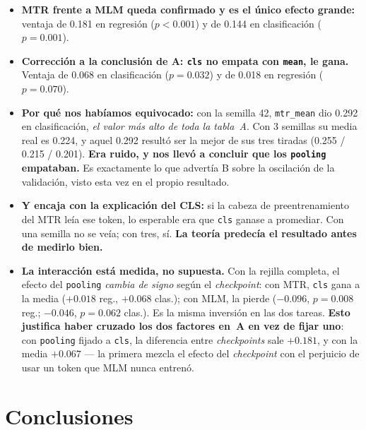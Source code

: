 \documentclass[11pt,a4paper]{article}
\newcommand{\var}[1]{\texttt{#1}}
\begin{document}
\begin{concl}
\begin{itemize}
  \item \textbf{MTR frente a MLM queda confirmado y es el único efecto grande:} ventaja de 0.181
        en regresión ($p<0.001$) y de 0.144 en clasificación ($p=0.001$).
  \item \textbf{Corrección a la conclusión de A: \var{cls} no empata con \var{mean}, le gana.}
        Ventaja de 0.068 en clasificación ($p=0.032$) y de 0.018 en regresión ($p=0.070$).
  \item \textbf{Por qué nos habíamos equivocado:} con la semilla 42, \var{mtr\_mean} dio 0.292 en
        clasificación, \emph{el valor más alto de toda la tabla~A}. Con 3 semillas su media real es
        0.224, y aquel 0.292 resultó ser la mejor de sus tres tiradas (0.255 / 0.215 / 0.201).
        \textbf{Era ruido, y nos llevó a concluir que los \var{pooling} empataban.} Es exactamente lo
        que advertía B sobre la oscilación de la validación, visto esta vez en el propio resultado.
  \item \textbf{Y encaja con la explicación del CLS:} si la cabeza de preentrenamiento del MTR leía
        ese token, lo esperable era que \var{cls} ganase a promediar. Con una semilla no se veía; con
        tres, sí. \textbf{La teoría predecía el resultado antes de medirlo bien.}
  \item \textbf{La interacción está medida, no supuesta.} Con la rejilla completa, el efecto del
        \var{pooling} \emph{cambia de signo} según el \emph{checkpoint}: con MTR, \var{cls} gana a
        la media ($+0.018$ reg., $+0.068$ clas.); con MLM, la pierde ($-0.096$, $p=0.008$ reg.;
        $-0.046$, $p=0.062$ clas.). Es la misma inversión en las dos tareas.
        \textbf{Esto justifica haber cruzado los dos factores en~A en vez de fijar uno}: con
        \var{pooling} fijado a \var{cls}, la diferencia entre \emph{checkpoints} sale $+0.181$, y con
        la media $+0.067$ --- la primera mezcla el efecto del \emph{checkpoint} con el perjuicio de
        usar un token que MLM nunca entrenó.
\end{itemize}
\end{concl}

\newpage
\section{Conclusiones}
\end{document}
